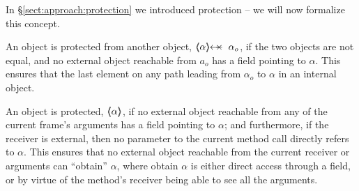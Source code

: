 \label{sect:protect}
%
%
%
%

In \S \ref{sect:approach:protection} we %
introduced protection -- we will now formalize this concept. %

 An object is protected from another object, $\protectedFrom{{\alpha}} {{\alpha_{o}}}$, if 
the two objects are not equal, and no external object reachable from $a_o$ has a field pointing to  $\alpha$.
This ensures that the last element on any path leading from $\alpha_o$ to $\alpha$
in an internal object.   
 

An object is protected,  $\langle\!\!\langle {\alpha} \rangle\!\!\rangle$,  if no external object
reachable from any of the current frame's arguments has a field
pointing to $\alpha$; and furthermore, if the receiver is external,
then
no parameter to the current method call directly refers to $\alpha$.
%
This  ensures that no external object reachable from the current
receiver or arguments can ``obtain'' $\alpha$, where obtain $\alpha$ is either direct access through a field,  
 or by virtue of the method's receiver %
 being able to see all the arguments.
 


